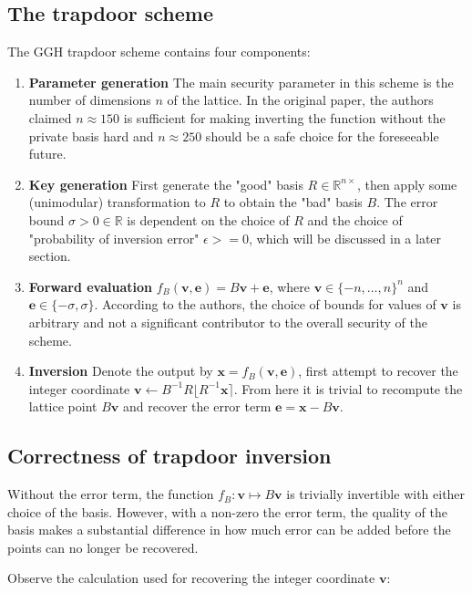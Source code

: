 \documentclass[letterpaper,12pt]{article}
\begin{document}
\subsection{The trapdoor scheme}
The GGH trapdoor scheme contains four components:

\begin{enumerate}
    \item \textbf{Parameter generation} The main security parameter in this scheme is the number of dimensions $n$ of the lattice. In the original paper, the authors claimed $n \approx 150$ is sufficient for making inverting the function without the private basis hard and $n \approx 250$ should be a safe choice for the foreseeable future.
    \item \textbf{Key generation} First generate the "good" basis $R \in \mathbb{R}^{n \times }$, then apply some (unimodular) transformation to $R$ to obtain the "bad" basis $B$. The error bound $\sigma > 0 \in \mathbb{R}$ is dependent on the choice of $R$ and the choice of "probability of inversion error" $\epsilon >= 0$, which will be discussed in a later section.
    \item \textbf{Forward evaluation} $f_{B}(\mathbf{v}, \mathbf{e}) = B\mathbf{v} + \mathbf{e}$, where $\mathbf{v} \in \{-n, \ldots, n\}^n$ and $\mathbf{e} \in \{-\sigma, \sigma\}$. According to the authors, the choice of bounds for values of $\mathbf{v}$ is arbitrary and not a significant contributor to the overall security of the scheme.
    \item \textbf{Inversion} Denote the output by $\mathbf{x} = f_{B}(\mathbf{v}, \mathbf{e})$, first attempt to recover the integer coordinate $\mathbf{v} \leftarrow B^{-1}R\lfloor R^{-1}\mathbf{x} \rceil$. From here it is trivial to recompute the lattice point $B\mathbf{v}$ and recover the error term $\mathbf{e} = \mathbf{x} - B\mathbf{v}$.
\end{enumerate}

\subsection{Correctness of trapdoor inversion}
Without the error term, the function $f_B: \mathbf{v} \mapsto B\mathbf{v}$ is trivially invertible with either choice of the basis. However, with a non-zero the error term, the quality of the basis makes a substantial difference in how much error can be added before the points can no longer be recovered.

Observe the calculation used for recovering the integer coordinate $\mathbf{v}$:
\end{document}
